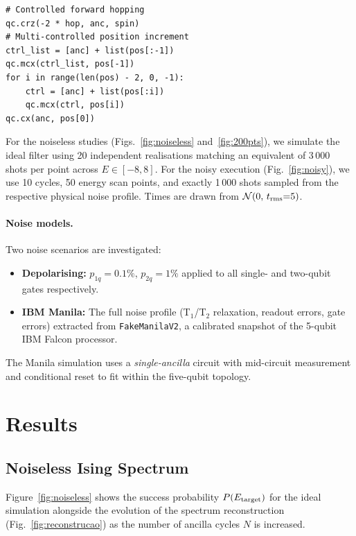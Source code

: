 \documentclass[twocolumn,10pt]{article}
\begin{document}
\begin{lstlisting}[caption={Increment logic for the Dirac kinetic
hopping term.},label={lst:dirac_code},float=*]
# Controlled forward hopping
qc.crz(-2 * hop, anc, spin)
# Multi-controlled position increment
ctrl_list = [anc] + list(pos[:-1])
qc.mcx(ctrl_list, pos[-1])
for i in range(len(pos) - 2, 0, -1):
    ctrl = [anc] + list(pos[:i])
    qc.mcx(ctrl, pos[i])
qc.cx(anc, pos[0])
\end{lstlisting}

For the noiseless studies (Figs.~\ref{fig:noiseless} and~\ref{fig:200pts}), 
we simulate the ideal filter using 20 independent realisations matching an equivalent 
of 3\,000 shots per point across $E\in[-8,8]$.
For the noisy execution (Fig.~\ref{fig:noisy}), we use 10 cycles, 50 energy scan points, 
and exactly 1\,000 shots sampled from the respective physical noise profile.
Times are drawn from $\mathcal{N}(0,\,t_{\rm rms}{=}5)$.

\paragraph{Noise models.}
Two noise scenarios are investigated:
\begin{itemize}
\item \textbf{Depolarising:} $p_{1q}=0.1\%$, $p_{2q}=1\%$ applied to
      all single- and two-qubit gates respectively.
\item \textbf{IBM Manila:} The full noise profile (T$_1$/T$_2$
      relaxation, readout errors, gate errors) extracted from
      \texttt{FakeManilaV2}, a calibrated snapshot of the 5-qubit IBM
      Falcon processor.
\end{itemize}

The Manila simulation uses a \emph{single-ancilla} circuit with
mid-circuit measurement and conditional reset to fit within the
five-qubit topology.

\section{Results}\label{sec:results}

\subsection{Noiseless Ising Spectrum}
Figure~\ref{fig:noiseless} shows the success probability
$P(E_{\rm target})$ for the ideal simulation alongside the evolution of the 
spectrum reconstruction (Fig.~\ref{fig:reconstrucao}) as the number of ancilla cycles $N$ 
is increased.
\end{document}
